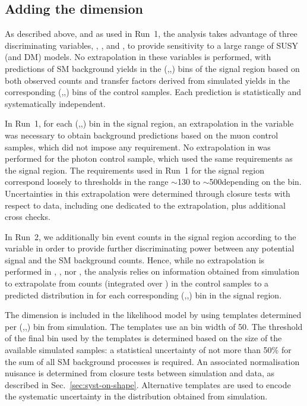 \subsection{Adding the \texorpdfstring{\mht}{MHT} dimension}
\label{sec:had-shape}

As described above, and as used in Run~1, the analysis takes advantage
of three discriminating variables, \njet, \nb, and \HT, to provide
sensitivity to a large range of SUSY (and DM) models. No extrapolation
in these variables is performed, with predictions of SM background
yields in the (\njet,\nb,\HT) bins of the signal region based on both
observed counts and transfer factors derived from simulated yields in
the corresponding (\njet,\nb,\HT) bins of the control samples. Each
prediction is statistically and systematically independent.

In Run~1, for each (\njet,\nb,\HT) bin in the signal region, an
extrapolation in the variable \alphat was necessary to obtain
background predictions based on the muon control samples, which did
not impose any \alphat requirement. No extrapolation in \alphat was
performed for the photon control sample, which used the same \alphat
requirements as the signal region. The \alphat requirements used in
Run~1 for the signal region correspond loosely to \mht thresholds in
the range $\sim$130 to $\sim$500\gev depending on the \HT
bin. Uncertainties in this extrapolation were determined through
closure tests with respect to data, including one dedicated to the
\alphat extrapolation, plus additional cross checks.

In Run~2, we additionally bin event counts in the signal region
according to the variable \mht in order to provide further
discriminating power between any potential signal and the SM
background counts. Hence, while no extrapolation is performed in
\njet, \nb, nor \HT, the analysis relies on information obtained
from simulation to extrapolate from counts (integrated over \mht) in
the control samples to a predicted distribution in \mht for each
corresponding (\njet,\nb,\HT) bin in the signal region.

The \mht dimension is included in the likelihood model by using
templates determined per (\njet,\nb,\HT) bin from simulation. The
templates use an \mht bin width of 50\gev. The threshold of the final
\mht bin used by the templates is determined based on the size of the
available simulated samples: a statistical uncertainty of not more
than 50\% for the sum of all SM background processes is required. An
associated normalisation nuisance is determined from closure tests
between simulation and data, as described in
Sec.~\ref{sec:syst-on-shape}. Alternative templates are used to encode
the systematic uncertainty in the \mht distribution obtained from
simulation.

